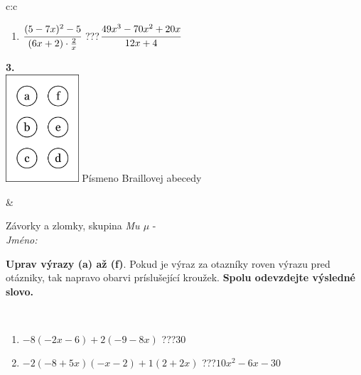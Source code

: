 \documentclass[10pt]{report}
\begin{document}
\begin{tabular}{c:c}
\begin{minipage}[c][104.5mm][t]{0.5\linewidth}
\begin{center}
\begin{minipage}{0.79\linewidth}
\begin{center}
\begin{varwidth}{\linewidth}
\begin{enumerate}
\item $\cfrac{(5-7x)^2-5}{(6x+2)\cdot\frac{2}{x}}$\quad \dotfill\; ???\;\dotfill \quad $\cfrac{49x^3-70x^2+20x}{12x+4}$
\end{enumerate}
\end{varwidth}
\end{center}
\end{minipage}
\begin{minipage}{0.20\linewidth}
\begin{center}
{\Huge\bfseries 3.} \\[2mm]
\includegraphics[height=40mm]{../images/braille.png}
{\small Písmeno Braillovej abecedy}
\end{center}
\end{minipage}
\end{center}
\end{minipage}
&
\begin{minipage}[c][104.5mm][t]{0.5\linewidth}
\begin{center}
\vspace{7mm}
{\huge Závorky a zlomky, skupina \textit{Mu $\mu$} -}\\[5mm]
\textit{Jméno:}\phantom{xxxxxxxxxxxxxxxxxxxxxxxxxxxxxxxxxxxxxxxxxxxxxxxxxxxxxxxxxxxxxxxxx}\\[5mm]
\begin{minipage}{0.95\linewidth}
\begin{center}
\textbf{Uprav výrazy (a) až (f)}. Pokud je výraz za otazníky roven výrazu pred otázniky, tak napravo obarvi príslušející kroužek. \textbf{Spolu odevzdejte výsledné slovo.}
\end{center}
\end{minipage}
\\[1mm]
\begin{minipage}{0.79\linewidth}
\begin{center}
\begin{varwidth}{\linewidth}
\begin{enumerate}
\normalsize
\item $-8(-2x-6)+2(-9-8x)$\quad \dotfill\; ???\;\dotfill \quad $30$
\item $-2(-8+5x)(-x-2)+1(2+2x)$\quad \dotfill\; ???\;\dotfill \quad $10x^2-6x-30$

\end{enumerate}
\end{varwidth}
\end{center}
\end{minipage}
\end{center}
\end{minipage}
\end{tabular}
\end{document}

